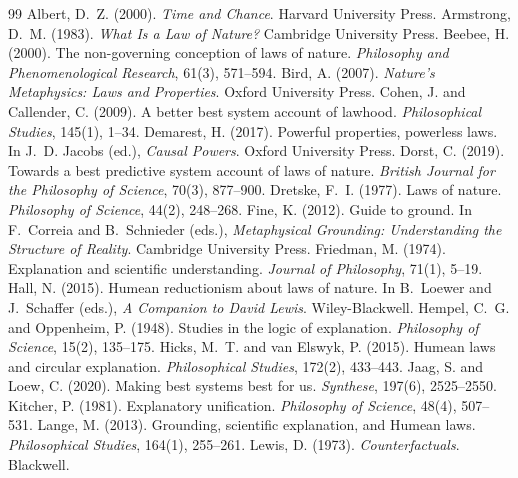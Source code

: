 \documentclass{situationist-preprint}
\begin{document}
\begin{thebibliography}{99}\small
{} Albert, D.~Z. (2000). \emph{Time and Chance}. Harvard University Press.
 Armstrong, D.~M. (1983). \emph{What Is a Law of Nature?} Cambridge University Press.
 Beebee, H. (2000). The non-governing conception of laws of nature. \emph{Philosophy and Phenomenological Research}, 61(3), 571--594.
 Bird, A. (2007). \emph{Nature's Metaphysics: Laws and Properties}. Oxford University Press.
 Cohen, J. and Callender, C. (2009). A better best system account of lawhood. \emph{Philosophical Studies}, 145(1), 1--34.
 Demarest, H. (2017). Powerful properties, powerless laws. In J.~D. Jacobs (ed.), \emph{Causal Powers}. Oxford University Press.
 Dorst, C. (2019). Towards a best predictive system account of laws of nature. \emph{British Journal for the Philosophy of Science}, 70(3), 877--900.
 Dretske, F.~I. (1977). Laws of nature. \emph{Philosophy of Science}, 44(2), 248--268.
 Fine, K. (2012). Guide to ground. In F.~Correia and B.~Schnieder (eds.), \emph{Metaphysical Grounding: Understanding the Structure of Reality}. Cambridge University Press.
 Friedman, M. (1974). Explanation and scientific understanding. \emph{Journal of Philosophy}, 71(1), 5--19.
 Hall, N. (2015). Humean reductionism about laws of nature. In B.~Loewer and J.~Schaffer (eds.), \emph{A Companion to David Lewis}. Wiley-Blackwell.
 Hempel, C.~G. and Oppenheim, P. (1948). Studies in the logic of explanation. \emph{Philosophy of Science}, 15(2), 135--175.
 Hicks, M.~T. and van Elswyk, P. (2015). Humean laws and circular explanation. \emph{Philosophical Studies}, 172(2), 433--443.
 Jaag, S. and Loew, C. (2020). Making best systems best for us. \emph{Synthese}, 197(6), 2525--2550.
 Kitcher, P. (1981). Explanatory unification. \emph{Philosophy of Science}, 48(4), 507--531.
 Lange, M. (2013). Grounding, scientific explanation, and Humean laws. \emph{Philosophical Studies}, 164(1), 255--261.
 Lewis, D. (1973). \emph{Counterfactuals}. Blackwell.

\end{thebibliography}
\end{document}
